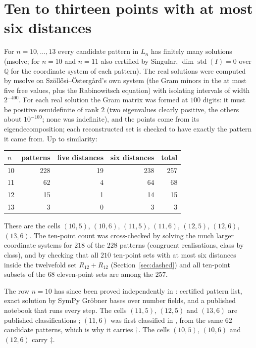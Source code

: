 \documentclass[11pt]{amsart}
\theoremstyle{remark}
\newcommand{\Q}{\mathbb{Q}}
\begin{document}
\section{Ten to thirteen points with at most six distances}\label{sec:ten}

For $n=10,\dots,13$ every candidate pattern in $L_n$ has finitely many solutions (msolve; for $n=10$ and
$n=11$ also certified by Singular, $\dim\operatorname{std}(I)=0$ over $\Q$ for the coordinate system of
each pattern). The real solutions were computed by msolve on
Szöllősi--Östergård's own system (the Gram minors in the at most five free values, plus the Rabinowitsch
equation) with isolating intervals of width $2^{-400}$. For each real solution the Gram matrix was formed at
$100$ digits: it must be positive semidefinite of rank $2$ (two eigenvalues clearly positive, the others
about $10^{-100}$; none was indefinite), and the points come from its eigendecomposition; each reconstructed set is checked to have
exactly the pattern it came from. Up to similarity:

\begin{center}
\begin{tabular}{@{}lrrrr@{}}
\toprule
$n$ & patterns & five distances & six distances & total\\
\midrule
10 & 228 & 19 & 238 & 257\\
11 & 62 & 4 & 64 & 68\\
12 & 15 & 1 & 14 & 15\\
13 & 3 & 0 & 3 & 3\\
\bottomrule
\end{tabular}
\end{center}

These are the cells $(10,5)$, $(10,6)$, $(11,5)$, $(11,6)$, $(12,5)$, $(12,6)$, $(13,6)$. The ten-point
count was cross-checked by solving the much larger coordinate systems for $218$ of the $228$ patterns
(congruent realisations, class by class), and by checking that all $210$ ten-point sets with at most six
distances inside the twelvefold set $R_{12}+R_{12}$ (Section~\ref{sec:dashed}) and all ten-point subsets
of the $68$ eleven-point sets are among the $257$.

The row $n=10$ has since been proved independently in \cite[Corollary~7]{AC}: certified pattern list, exact
solution by SymPy Gröbner bases over number fields, and a published notebook that runs every step. The cells
$(11,5)$, $(12,5)$ and $(13,6)$ are published classifications \cite{W11,EF,Sh08,W12}; $(11,6)$ was first
classified in \cite[Lemma~6]{AA}, from the same $62$ candidate patterns, which is why it carries $\dagger$.
The cells $(10,5)$, $(10,6)$ and $(12,6)$ carry $\ddagger$.
\end{document}
